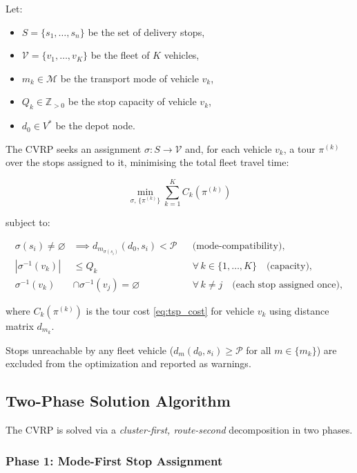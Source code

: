 \documentclass[12pt, a4paper]{article}
\theoremstyle{definition}
\begin{document}
Let:
\begin{itemize}
  \item $S = \{s_1, \ldots, s_n\}$ be the set of delivery stops,
  \item $\mathcal{V} = \{v_1, \ldots, v_K\}$ be the fleet of $K$ vehicles,
  \item $m_k \in \mathcal{M}$ be the transport mode of vehicle $v_k$,
  \item $Q_k \in \mathbb{Z}_{>0}$ be the stop capacity of vehicle $v_k$,
  \item $d_0 \in V^*$ be the depot node.
\end{itemize}

The CVRP seeks an assignment $\sigma : S \to \mathcal{V}$ and, for each
vehicle $v_k$, a tour $\pi^{(k)}$ over the stops assigned to it, minimising
the total fleet travel time:

\begin{equation}
  \label{eq:cvrp}
  \min_{\sigma,\, \{\pi^{(k)}\}} \sum_{k=1}^{K} C_k\!\left(\pi^{(k)}\right)
\end{equation}

\noindent subject to:

\begin{align}
  \sigma(s_i) \neq \varnothing
    &\implies d_{m_{\sigma(s_i)}}(d_0, s_i) < \mathcal{P}
    & &\text{(mode-compatibility)}, \label{eq:cvrp_mode}\\
  \left|\sigma^{-1}(v_k)\right| &\leq Q_k
    & &\forall\, k \in \{1,\ldots,K\}\quad\text{(capacity)},\label{eq:cvrp_cap}\\
  \sigma^{-1}(v_k) &\cap \sigma^{-1}(v_j) = \varnothing
    & &\forall\, k \neq j\quad\text{(each stop assigned once)}, \label{eq:cvrp_part}
\end{align}

\noindent where $C_k(\pi^{(k)})$ is the tour cost \eqref{eq:tsp_cost} for
vehicle $v_k$ using distance matrix $d_{m_k}$.

Stops unreachable by any fleet vehicle ($d_m(d_0, s_i) \geq \mathcal{P}$
for all $m \in \{m_k\}$) are excluded from the optimization and reported as
warnings.

\subsection{Two-Phase Solution Algorithm}

The CVRP is solved via a \emph{cluster-first, route-second} decomposition in
two phases.

\subsubsection{Phase 1: Mode-First Stop Assignment}
\end{document}
